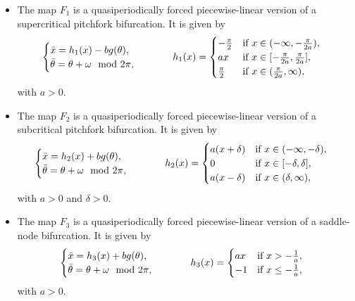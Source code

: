 \documentclass[12pt]{article}
\theoremstyle{plain}
\theoremstyle{remark}
\theoremstyle{definition}
\begin{document}
\begin{itemize}
    \item The map $F_1$ is a quasiperiodically forced piecewise-linear version of a supercritical pitchfork bifurcation. It is given by
    \begin{align}\label{dyn_sys}
        \begin{cases}
            \Bar{x} = h_{1}(x) - b g(\theta),\\
            \Bar{\theta} = \theta + \omega \mod2\pi,
        \end{cases}
        &\hspace{1cm}
        h_{1}(x)= 
        \begin{cases}
            -\frac{\pi}{2} &\text{if }x\in(-\infty,-\frac{\pi}{2a}),\\
            ax & \text{if }x\in[-\frac{\pi}{2a},\frac{\pi}{2a}],\\
            \frac{\pi}{2} &\text{if }x\in(\frac{\pi}{2a},\infty),
        \end{cases}
    \end{align}
    with $a>0$.
    
    \item The map $F_2$ is a quasiperiodically forced piecewise-linear version of a subcritical pitchfork bifurcation. It is given by
    \begin{align}\label{dyn_sys_2}
        \begin{cases}
            \Bar{x} = h_{2}(x) + b g(\theta),\\
            \Bar{\theta} = \theta + \omega \mod2\pi,
        \end{cases}
        &\hspace{1cm}
        h_{2}(x)= 
        \begin{cases}
            a(x+\delta) &\text{if }x\in(-\infty,-\delta),\\
            0 & \text{if }x\in[-\delta,\delta],\\
            a(x-\delta) &\text{if }x\in(\delta,\infty),
        \end{cases}
    \end{align}
    with $a>0$ and $\delta>0$.

    \item The map $F_3$ is a quasiperiodically forced piecewise-linear version of a saddle-node bifurcation. It is given by
    \begin{align}\label{dyn_sys_3}
        \begin{cases}
            \Bar{x} = h_{3}(x) + b g(\theta),\\
            \Bar{\theta} = \theta + \omega \mod2\pi,
        \end{cases}
        &\hspace{1cm}
        h_{3}(x)= 
        \begin{cases}
            ax & \text{if }x>-\frac{1}{a},\\
            -1 &\text{if }x\leq-\frac{1}{a},
        \end{cases}
    \end{align}
    with $a>0$.


\end{itemize}
\end{document}
